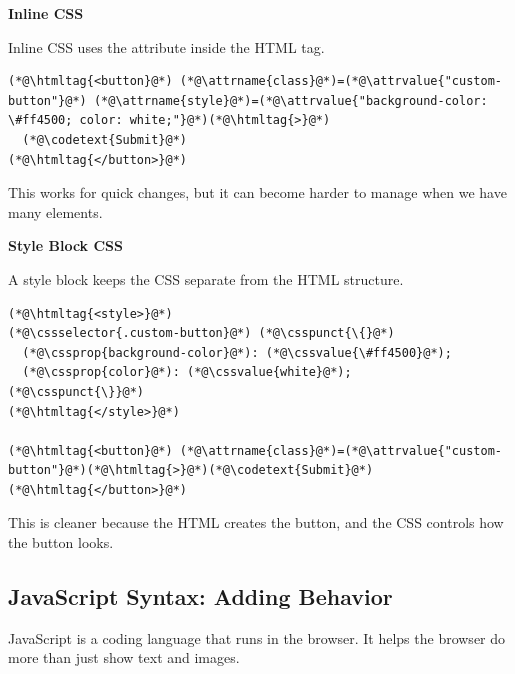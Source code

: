 \documentclass{article}
\begin{document}
\noindent
\begin{minipage}[t]{0.48\textwidth}
  \textbf{\Bitter\textcolor{naranja}{Inline CSS}}

  \vspace{0.1cm}

  Inline CSS uses the  attribute inside the HTML tag.

  \begin{lstlisting}
(*@\htmltag{<button}@*) (*@\attrname{class}@*)=(*@\attrvalue{"custom-button"}@*) (*@\attrname{style}@*)=(*@\attrvalue{"background-color: \#ff4500; color: white;"}@*)(*@\htmltag{>}@*)
  (*@\codetext{Submit}@*)
(*@\htmltag{</button>}@*)
\end{lstlisting}

  This works for quick changes, but it can become harder to manage when we have many elements.
\end{minipage}
\hfill
\begin{minipage}[t]{0.48\textwidth}
  \textbf{\Bitter\textcolor{naranja}{Style Block CSS}}

  \vspace{0.1cm}

  A style block keeps the CSS separate from the HTML structure.

  \begin{lstlisting}
(*@\htmltag{<style>}@*)
(*@\cssselector{.custom-button}@*) (*@\csspunct{\{}@*)
  (*@\cssprop{background-color}@*): (*@\cssvalue{\#ff4500}@*);
  (*@\cssprop{color}@*): (*@\cssvalue{white}@*);
(*@\csspunct{\}}@*)
(*@\htmltag{</style>}@*)

(*@\htmltag{<button}@*) (*@\attrname{class}@*)=(*@\attrvalue{"custom-button"}@*)(*@\htmltag{>}@*)(*@\codetext{Submit}@*)(*@\htmltag{</button>}@*)
\end{lstlisting}

  This is cleaner because the HTML creates the button, and the CSS controls how the button looks.
\end{minipage}

\vspace{0.5cm}


\subsection*{\Bitter\textcolor{naranja}{JavaScript Syntax: Adding Behavior}}
\label{subsec:javascript-syntax}

JavaScript is a coding language that runs in the browser.
It helps the browser do more than just show text and images.
\end{document}
